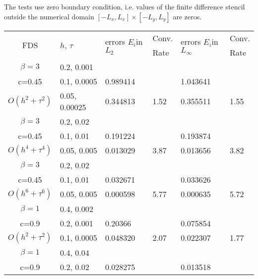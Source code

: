 \documentclass[%
 aip,
cp,  %
 amsmath,amssymb,%
 reprint,%
]{revtex4-2}
\begin{document}
The tests use zero boundary condition, i.e. values of the finite difference stencil outside the numerical domain $[-L_x, L_x] \times [-L_y, L_y]$ are zeros.

\begin{table}[ht]
\centering
\small
		\begin{tabular}{||c|l|ll|ll||}
			\hline
			\hline
      \multirow{2  }{*}{FDS}        & \multirow{2  }{*}{$h$, $\tau$}  & \multirow{2  }{*}{errors $E_i$in$L_2$}  &Conv.& \multirow{2  }{*}{errors $E_i$in$L_\infty$}  &Conv.  \\
	         &                    &                               & Rate   &                                        & Rate \\
   			\hline 
					\hline 
  $\beta=3$                &0.2, 0.001          &              &              &                     &      \\
   c=0.45                     &0.1, 0.0005          &0.989414 &            &1.043641    &       \\
     $O(h^2 + \tau^ 2)$ &0.05, 0.00025   & 0.344813 & 1.52    &0.355511    &  1.55      \\
			\hline 
  $\beta=3$               &0.2, 0.02       &              &            &                     &      \\
   c=0.45                    &0.1, 0.01      &0.191224 &            &0.193874    &       \\
     $O(h^4+ \tau^4)$ &0.05, 0.005&0.013029 & 3.87   &0.013656     &3.82       \\
			\hline 
  $\beta=3$               &0.2, 0.02       &                &            &                     &      \\
     c=0.45                 &0.1, 0.01        &0.032671 &            &  0.033626    &       \\
     $O(h^6+ \tau^6)$ &0.05, 0.005 &0.000598 &5.77     & 0.000635    & 5.72       \\
	   \hline
			\hline 
       $\beta=1$       &0.4, 0.002        &             &            &           &   \\
                  c=0.9    &0.2, 0.001       &  0.20366   &            &0.075854 &   \\
  $O(h^2+ \tau^2)$ &0.1, 0.0005   &0.048320   &2.07  &0.022307  & 1.77 \\
			\hline
      $\beta=1$               &0.4, 0.04    &            &               &             &    \\
       c=0.9                     &0.2, 0.02     & 0.028275   &        &  0.013518   &   \\

\end{tabular}
\end{table}
\end{document}

